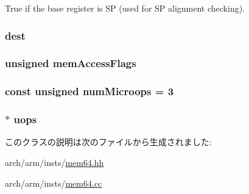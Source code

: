True if the base register is SP (used for SP alignment checking). \hypertarget{classArmISA_1_1Memory64_aec72e8e45bdc87abeeeb75d2a8a9a716}{
\subsubsection[{dest}]{ {\bf dest}}}
\label{classArmISA_1_1Memory64_aec72e8e45bdc87abeeeb75d2a8a9a716}
\hypertarget{classArmISA_1_1Memory64_a827c936c9e2b1f1cf21a01f204a8d821}{
\subsubsection[{memAccessFlags}]{\setlength{\rightskip}{0pt plus 5cm}unsigned {\bf memAccessFlags}}}
\label{classArmISA_1_1Memory64_a827c936c9e2b1f1cf21a01f204a8d821}
\hypertarget{classArmISA_1_1Memory64_a0e01007cc580b30b13363bf037eb849f}{
\subsubsection[{numMicroops}]{\setlength{\rightskip}{0pt plus 5cm}const unsigned {\bf numMicroops} = 3}}
\label{classArmISA_1_1Memory64_a0e01007cc580b30b13363bf037eb849f}
\hypertarget{classArmISA_1_1Memory64_a4b95b3465f3133312f95fdaf25b90b36}{
\subsubsection[{uops}]{$\ast$ {\bf uops}}}
\label{classArmISA_1_1Memory64_a4b95b3465f3133312f95fdaf25b90b36}


このクラスの説明は次のファイルから生成されました:\begin{DoxyCompactItemize}
\item 
arch/arm/insts/\hyperlink{mem64_8hh}{mem64.hh}\item 
arch/arm/insts/\hyperlink{mem64_8cc}{mem64.cc}\end{DoxyCompactItemize}
